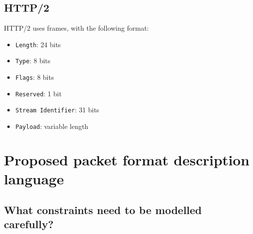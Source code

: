 \documentclass[10pt]{article}
\begin{document}
\subsection{HTTP/2}

HTTP/2 uses frames, with the following format:
\begin{itemize}
\item \texttt{Length}: 24 bits
\item \texttt{Type}: 8 bits
\item \texttt{Flags}: 8 bits
\item \texttt{Reserved}: 1 bit
\item \texttt{Stream Identifier}: 31 bits
\item \texttt{Payload}: variable length
\end{itemize}


\section{Proposed packet format description language}

\subsection{What constraints need to be modelled carefully?}
\end{document}
